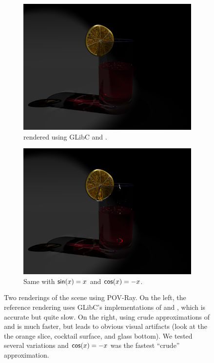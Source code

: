 \documentclass[paper.tex]{subfiles}
\begin{document}
\begin{figure}
  \begin{subfigure}[t]{.48\linewidth}
    \includegraphics[width=\linewidth]{images/double_all_glibc.png}
    \caption{ rendered using GLibC  and .}
    \label{fig:grenadine-glibc}
  \end{subfigure}%
  \hfill%
  \begin{subfigure}[t]{.48\linewidth}
    \includegraphics[width=\linewidth]{images/double_all_const.png}
    \caption{Same with $\text{\textsf{sin}}(x) = x$ and $\text{\textsf{cos}}(x) = -x$.}
    \label{fig:grenadine-crappy}
  \end{subfigure}%
  \caption{
    Two renderings of the  scene using POV-Ray.
    On the left, the reference rendering
      uses GLibC's implementations of  and ,
      which is accurate but quite slow.
    On the right, using crude approximations of  and 
      is much faster, but leads to obvious visual artifacts
      (look at the the orange slice, cocktail surface, and glass bottom).
    We tested several variations and $\text{\textsf{cos}}(x) = -x$
      was the fastest ``crude'' approximation.
  }
  \label{fig:grenadines}
\end{figure}
\end{document}
